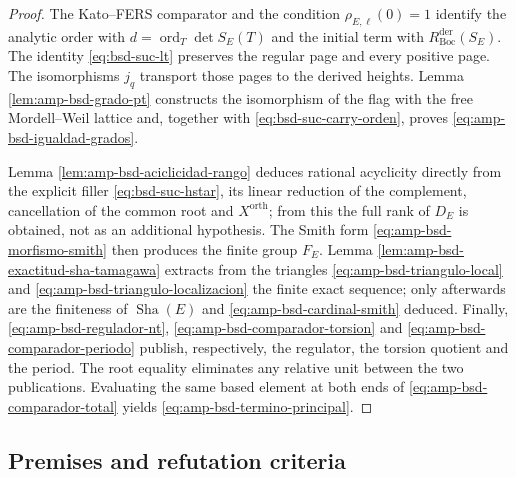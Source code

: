 \begin{proof}
The Kato--FERS comparator and the condition
\(\rho_{E,\ell}(0)=1\) identify the analytic order with
\(d=\operatorname{ord}_T\det S_E(T)\) and the initial term with
\(R_{\mathrm{Boc}}^{\mathrm{der}}(S_E)\). The identity
\eqref{eq:bsd-suc-lt} preserves the regular page and every positive page. The
isomorphisms \(j_q\) transport those pages to the derived heights.
Lemma \ref{lem:amp-bsd-grado-pt} constructs the isomorphism of the flag with the
free Mordell--Weil lattice and, together with
\eqref{eq:bsd-suc-carry-orden}, proves
\eqref{eq:amp-bsd-igualdad-grados}.

Lemma \ref{lem:amp-bsd-aciclicidad-rango} deduces rational acyclicity
directly from the explicit filler \eqref{eq:bsd-suc-hstar}, its linear
reduction of the complement, cancellation of the common root and
\(X^{\mathrm{orth}}\); from this the full rank of \(D_E\) is obtained, not
as an additional hypothesis. The Smith form
\eqref{eq:amp-bsd-morfismo-smith} then produces the finite group \(F_E\).
Lemma \ref{lem:amp-bsd-exactitud-sha-tamagawa} extracts from the triangles
\eqref{eq:amp-bsd-triangulo-local} and
\eqref{eq:amp-bsd-triangulo-localizacion} the finite exact sequence; only
afterwards are the finiteness of \(\operatorname{Sha}(E)\) and
\eqref{eq:amp-bsd-cardinal-smith} deduced. Finally,
\eqref{eq:amp-bsd-regulador-nt},
\eqref{eq:amp-bsd-comparador-torsion} and
\eqref{eq:amp-bsd-comparador-periodo} publish, respectively, the regulator,
the torsion quotient and the period. The root equality eliminates any relative
unit between the two publications. Evaluating the same based element at
both ends of \eqref{eq:amp-bsd-comparador-total} yields
\eqref{eq:amp-bsd-termino-principal}.
\end{proof}

\subsection{Premises and refutation criteria}
\label{subsec:amp-bsd-falsadores}


